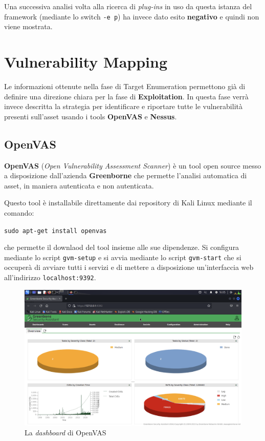 \documentclass[a4paper, 12pt, oneside]{article}
\begin{document}
Una successiva analisi volta alla ricerca di \textit{plug-ins} in uso da questa istanza del framework (mediante lo switch \texttt{-e p}) ha invece dato esito \textbf{negativo} e quindi non viene mostrata.

\newpage
\section{Vulnerability Mapping}
Le informazioni ottenute nella fase di Target Enumeration permettono già di definire una direzione chiara per la fase di \textbf{Exploitation}. In questa fase verrà invece descritta la strategia per identificare e riportare tutte le vulnerabilità presenti sull'asset usando i tools \textbf{OpenVAS} e \textbf{Nessus}.

\subsection{OpenVAS}
\textbf{OpenVAS} (\textit{Open Vulnerability Assessment Scanner}) è un tool open source messo a disposizione dall'azienda \textbf{Greenborne} che permette l'analisi automatica di asset, in maniera autenticata e non autenticata.\cite{openvas}

Questo tool è installabile direttamente dai repository di Kali Linux mediante il comando:

\begin{center}
    \texttt{sudo apt-get install openvas}
\end{center}

che permette il downlaod del tool insieme alle sue dipendenze. Si configura mediante lo script \texttt{gvm-setup} e si avvia mediante lo script \texttt{gvm-start} che si occuperà di avviare tutti i servizi e di mettere a disposizione un'interfaccia web all'indirizzo \texttt{localhost:9392}.

\begin{figure}[h!]
    \centering
    \includegraphics[width=0.8 \textwidth]{img/openvas-dashboard.png}
    \caption{La \textit{dashboard} di OpenVAS}
\end{figure}
\end{document}
